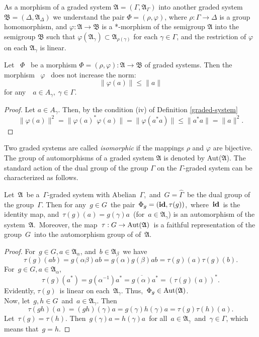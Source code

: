 \documentclass[
11pt,%
tightenlines,%
twoside,%
onecolumn,%
nofloats,%
nobibnotes,%
nofootinbib,%
superscriptaddress,%
noshowpacs,%
centertags]%
{revtex4}
\begin{document}
\medskip\noindent  As a morphism of a graded system $\mathfrak A=(\Gamma, \mathfrak A_\Gamma)$  into another graded system  $\mathfrak B=(\Delta, \mathfrak A_\Delta)$ we understand the pair $\Phi = (\rho, \varphi)$, where $\rho:\Gamma\rightarrow \Delta$  is a group homomorphism, and  $\varphi: \mathfrak A \rightarrow \mathfrak B$  is   a *-morphism of the semigroup $\mathfrak A$ into the semigroup  $\mathfrak B$ such that  $\varphi (\mathfrak A_\gamma)\subset    \mathfrak A_{\rho(\gamma)}$  for each $\gamma\in \Gamma$, and the restriction of $\varphi$  on each  $\mathfrak A_\gamma$ is linear.

\begin{proposition}\label{cont-morphism}
Let \ $\Phi$ \ be a morphism $\Phi=(\rho, \varphi):\mathfrak A\rightarrow \mathfrak B$  of graded systems. Then the morphism \ $\varphi$ \ does not increase the norm:
$$\|\varphi(a)\|\leq \|a\|
$$
for any\ \  $a\in A_\gamma,\ \gamma\in \Gamma$.
\end{proposition}
\begin{proof}
Let $a\in A_\gamma$. Then, by the condition  (iv) of Definition \ref{graded-system}
$$\|\varphi(a)\|^2 = \|\varphi(a)^*\varphi(a)\| = \|\varphi(a^*a)\|\leq \|a^*a\| = \|a\|^2.$$
\end{proof}
\noindent Two graded systems are called {\em isomorphic} if the mappings  $\rho$   and $\varphi$ are bijective. The group of automorphisms of a graded system $\mathfrak A$ is denoted by Aut($\mathfrak A$).
The standard action of the dual group of the group $\Gamma$ on the $\Gamma$-graded system can be characterized as follows.
\begin{proposition}
    Let\ $\mathfrak A$\  be  a\  $\Gamma$-graded system with Abelian\ $\Gamma$,\ and\ $G=\widehat\Gamma$\  be the dual group of the group\ $\Gamma$.  Then for any\ $g\in G$\ the pair\  $\Phi_g = ({\bf id}, \tau(g))$,\ where\ ${\bf id}$\ is the identity map, and\ $\tau(g)(a)=g(\gamma)a$\  (for\ $a\in\mathfrak A_\gamma$) is an automorphism of the system\ $\mathfrak A$.\  Moreover, the map\ $\tau: G\rightarrow \rm{Aut}(\mathfrak A)$\ is a faithful representation of the group\ $G$\  into the automorphism group of  of\ $\mathfrak A$.
\end{proposition}
\begin{proof}
 For\ $g\in G, a\in\mathfrak   A_\alpha$, and\ $b\in\mathfrak A_\beta$\ we have
 $$
 \tau(g)(ab)=g(\alpha\beta)ab=g(\alpha)g(\beta)ab=\tau(g)(a)\tau(g)(b).$$
  For\  $g\in G, a\in\mathfrak   A_\alpha$,
 $$
 \tau(g)(a^*)=g(\alpha^{-1})a^*=\overline{g(\alpha)}a^*=(\tau(g)(a))^*.$$
  Evidently, $\tau(g)$\  is linear on each\ $\mathfrak A_\gamma$. Thus,\ $\Phi_g\in\rm{Aut}(\mathfrak A)$.\\
 Now, let\ $g,h\in G$\ and\ $a\in\mathfrak  A_\gamma$. Then
  $$
  \tau(gh)(a)=(gh)(\gamma)a=g(\gamma)h(\gamma)a=\tau(g)\tau(h)(a).$$
 Let\ $\tau(g)=\tau(h)$. Then\ $g(\gamma)a=h(\gamma)a$\ for all\ $a\in\mathfrak  A_\gamma$\  and\ $\gamma\in\Gamma$,  which means that\ $g=h$.\end{proof}
\end{document}

